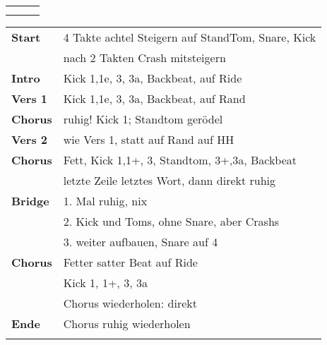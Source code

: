 

\begin{tabular}{p{0.6cm}p{12cm}p{1.4cm}}
	\rowcolor{cyan} \myRow{\thesongnumber} & \myRow{Die Leidenschaft} & \myRow{70} \\
	                                       &                          &            \\
\end{tabular}

\begin{tabular}{p{1.6cm}l}
	\textbf{Start}  & 4 Takte achtel Steigern auf StandTom, Snare, Kick \\
	                & nach 2 Takten Crash mitsteigern                   \\
	\textbf{Intro}  & Kick 1,1e, 3, 3a, Backbeat, \sechzehntel auf Ride \\
	\textbf{Vers 1} & Kick 1,1e, 3, 3a, Backbeat, \sechzehntel auf Rand \\
	\textbf{Chorus} & ruhig! Kick 1; Standtom gerödel                   \\
	\textbf{Vers 2} & wie Vers 1, statt auf Rand auf HH                 \\
	\textbf{Chorus} & Fett, Kick 1,1+, 3, Standtom, 3+,3a, Backbeat     \\
	                & letzte Zeile letztes Wort, dann direkt ruhig      \\
	\textbf{Bridge} & 1. Mal ruhig, nix                                 \\
	                & 2. Kick und Toms, ohne Snare, aber Crashs         \\
	                & 3. weiter aufbauen, Snare auf 4                   \\ %
	\textbf{Chorus} & Fetter satter Beat auf Ride                       \\
	                & Kick 1, 1+, 3, 3a                                 \\
	                & Chorus wiederholen: direkt                        \\
	\textbf{Ende}   & Chorus ruhig wiederholen                          \\
	                &                                                   \\
\end{tabular}
